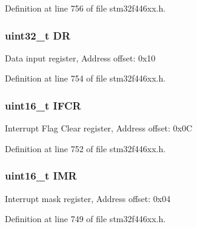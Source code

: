 Definition at line 756 of file stm32f446xx.\+h.

\subsubsection[{\texorpdfstring{DR}{DR}}]{ uint32\+\_\+t DR}\hypertarget{struct_s_p_d_i_f_r_x___type_def_a3df0d8dfcd1ec958659ffe21eb64fa94}{}\label{struct_s_p_d_i_f_r_x___type_def_a3df0d8dfcd1ec958659ffe21eb64fa94}
Data input register, Address offset\+: 0x10 

Definition at line 754 of file stm32f446xx.\+h.

\subsubsection[{\texorpdfstring{I\+F\+CR}{IFCR}}]{ uint16\+\_\+t I\+F\+CR}\hypertarget{struct_s_p_d_i_f_r_x___type_def_a3a5a3a6154d16d0a8d2f25b0ac3237a7}{}\label{struct_s_p_d_i_f_r_x___type_def_a3a5a3a6154d16d0a8d2f25b0ac3237a7}
Interrupt Flag Clear register, Address offset\+: 0x0C 

Definition at line 752 of file stm32f446xx.\+h.

\subsubsection[{\texorpdfstring{I\+MR}{IMR}}]{ uint16\+\_\+t I\+MR}\hypertarget{struct_s_p_d_i_f_r_x___type_def_af29a8211f72bbda9316551ea02ae4b37}{}\label{struct_s_p_d_i_f_r_x___type_def_af29a8211f72bbda9316551ea02ae4b37}
Interrupt mask register, Address offset\+: 0x04 

Definition at line 749 of file stm32f446xx.\+h.

